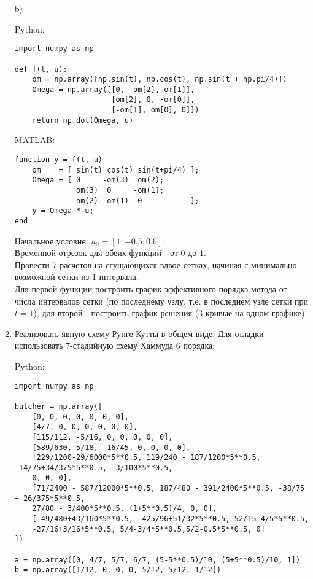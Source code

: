\begin{enumerate}
b)

Python:
\begin{verbatim}
import numpy as np

def f(t, u):
    om = np.array([np.sin(t), np.cos(t), np.sin(t + np.pi/4)])
    Omega = np.array([[0, -om[2], om[1]],
                      [om[2], 0, -om[0]],
                      [-om[1], om[0], 0]])
    return np.dot(Omega, u)
\end{verbatim}

MATLAB:
\begin{matlablisting}
	\begin{verbatim}
function y = f(t, u)
    om    = [ sin(t) cos(t) sin(t+pi/4) ];
    Omega = [ 0     -om(3)  om(2); 
              om(3)  0     -om(1);
             -om(2)  om(1)  0           ];
    y = Omega * u;
end
	\end{verbatim}
\end{matlablisting}

Начальное условие: $u_0 = [1; -0.5; 0.6];$\\
Временной отрезок для обеих функций - от 0 до 1.\\
Провести 7 расчетов на сгущающихся вдвое сетках, начиная с минимально возможной сетки из 1 интервала.\\
Для первой функции построить график эффективного порядка метода от числа интервалов сетки (по последнему узлу, т.е. в последнем узле сетки при $t=1$), для второй - построить график решения (3 кривые на одном графике). 
\item Реализовать явную схему Рунге-Кутты в общем виде. Для отладки использовать 7-стадийную схему Хаммуда 6 порядка:  

Python:
\begin{verbatim}
import numpy as np

butcher = np.array([
    [0, 0, 0, 0, 0, 0, 0],
    [4/7, 0, 0, 0, 0, 0, 0],
    [115/112, -5/16, 0, 0, 0, 0, 0],
    [589/630, 5/18, -16/45, 0, 0, 0, 0],
    [229/1200-29/6000*5**0.5, 119/240 - 187/1200*5**0.5, -14/75+34/375*5**0.5, -3/100*5**0.5,
    0, 0, 0],
    [71/2400 - 587/12000*5**0.5, 187/480 - 391/2400*5**0.5, -38/75 + 26/375*5**0.5,
    27/80 - 3/400*5**0.5, (1+5**0.5)/4, 0, 0],
    [-49/480+43/160*5**0.5, -425/96+51/32*5**0.5, 52/15-4/5*5**0.5,
    -27/16+3/16*5**0.5, 5/4-3/4*5**0.5,5/2-0.5*5**0.5, 0]
])

a = np.array([0, 4/7, 5/7, 6/7, (5-5**0.5)/10, (5+5**0.5)/10, 1])
b = np.array([1/12, 0, 0, 0, 5/12, 5/12, 1/12])


\end{verbatim}
\end{enumerate}
